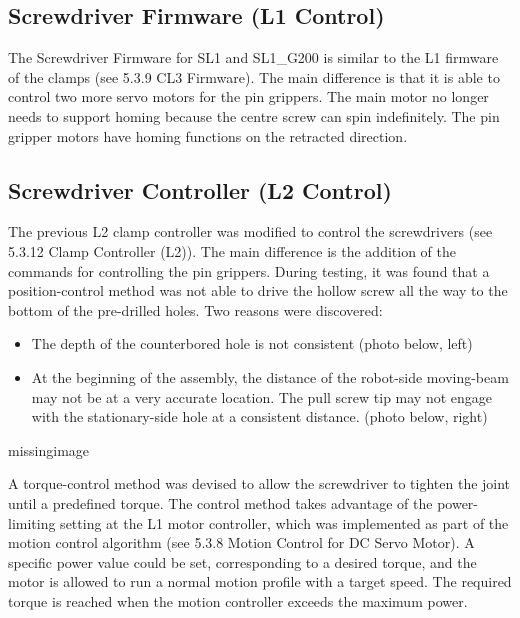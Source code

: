 \subsection{Screwdriver Firmware (L1 Control)}
\label{subsection:exploration_4_screwdriver_firmware_l1_control}

The Screwdriver Firmware for SL1 and SL1\_G200 is similar to the L1 firmware of the clamps (see 5.3.9 CL3 Firmware). The main difference is that it is able to control two more servo motors for the pin grippers.
The main motor no longer needs to support homing because the centre screw can spin indefinitely. The pin gripper motors have homing functions on the retracted direction.

\subsection{Screwdriver Controller (L2 Control)}
\label{subsection:exploration_4_screwdriver_controller_l2_control}

The previous L2 clamp controller was modified to control the screwdrivers (see 5.3.12 Clamp Controller (L2)). The main difference is the addition of the commands for controlling the pin grippers. 
During testing, it was found that a position-control method was not able to drive the hollow screw all the way to the bottom of the pre-drilled holes. Two reasons were discovered: 
\begin{itemize}
    \item The depth of the counterbored hole is not consistent (photo below, left)
    \item At the beginning of the assembly, the distance of the robot-side moving-beam may not be at a very accurate location. The pull screw tip may not engage with the stationary-side hole at a consistent distance. (photo below, right)
\end{itemize}

missingimage

A torque-control method was devised to allow the screwdriver to tighten the joint until a predefined torque. The control method takes advantage of the power-limiting setting at the L1 motor controller, which was implemented as part of the motion control algorithm (see 5.3.8 Motion Control for DC Servo Motor). A specific power value could be set, corresponding to a desired torque, and the motor is allowed to run a normal motion profile with a target speed. The required torque is reached when the motion controller exceeds the maximum power. 

